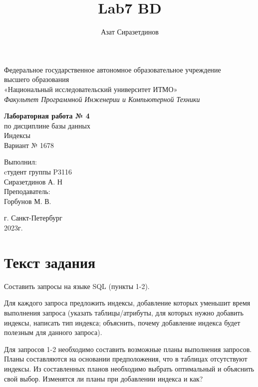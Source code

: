 \documentclass[12pt]{article}
\title{Lab7 BD}
\author{Азат Сиразетдинов}
\begin{document}
	\thispagestyle{empty}
	\begin{center}
		Федеральное государственное автономное образовательное учреждение\\ 
		высшего образования\\
		«Национальный исследовательский университет ИТМО»\\
		\textit{Факультет Программной Инженерии и Компьютерной Техники}\\
	\end{center}
	\vspace{2cm}
	\begin{center}
		\large
		\textbf{Лабораторная работа № 4}\\
		по дисциплине базы данных\\
		Индексы\\
		Вариант № 1678
	\end{center}
	\vspace{7cm}
	\begin{flushright}
		Выполнил:\\
		cтудент  группы P3116\\
		Сиразетдинов А. Н\\
		Преподаватель: \\
		Горбунов М. В.\\
	\end{flushright}
	\vspace{6cm}
	\begin{center}
		г. Санкт-Петербург\\
		2023г.
	\end{center}
	\newpage
	
	\tableofcontents
	\newpage
	
	\section{Текст задания}
	Составить запросы на языке SQL (пункты 1-2).
	
	Для каждого запроса предложить индексы, добавление которых уменьшит время выполнения запроса (указать таблицы/атрибуты, для которых нужно добавить индексы, написать тип индекса; объяснить, почему добавление индекса будет полезным для данного запроса).
	
	Для запросов 1-2 необходимо составить возможные планы выполнения запросов. Планы составляются на основании предположения, что в таблицах отсутствуют индексы. Из составленных планов необходимо выбрать оптимальный и объяснить свой выбор.
	Изменятся ли планы при добавлении индекса и как?
	
\end{document}
